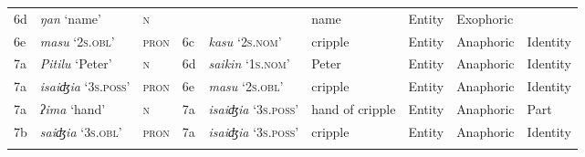\documentclass[output=paper
,modfonts
,nonflat]{langsci/langscibook}
\begin{document}
\begin{sidewaystable}
{\begin{tabular}{ll l lll lll}
	6d & \textit{ŋan} ‘name’ & \textsc{n} & ~ & ~ & name & Entity & Exophoric & ~\\
	6e & \textit{masu} ‘\textsc{2s.obl}’ & \textsc{pron} & 6c & \textit{kasu} ‘\textsc{2s.nom}’ & cripple & Entity & Anaphoric & Identity\\
	7a & \textit{Pitilu} ‘Peter’ & \textsc{n} & 6d & \textit{saikin} ‘\textsc{1s.nom}’ & Peter & Entity & Anaphoric & Identity\\
	7a & \textit{isaiʤia} ‘\textsc{3s.poss}’ & \textsc{pron} & 6e & \textit{masu} ‘\textsc{2s.obl}’ & cripple & Entity & Anaphoric & Identity\\
	7a & \textit{ʔima} ‘hand’ & \textsc{n} & 7a & \textit{isaiʤia} ‘\textsc{3s.poss}’ & hand of cripple & Entity & Anaphoric & Part\\
	7b & \textit{saiʤia} ‘\textsc{3s.obl}’ & \textsc{pron} & 7a & \textit{isaiʤia} ‘\textsc{3s.poss}’ & cripple & Entity & Anaphoric & Identity\\
	\lspbottomrule
\end{tabular}} 
\end{sidewaystable}
	
\end{document}
